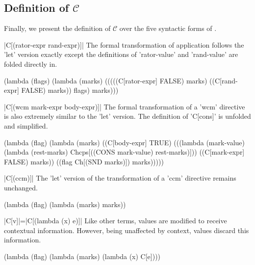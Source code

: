 \subsection{Definition of $\mathcal{C}$}

Finally, we present the definition of $\mathcal{C}$ over the five syntactic forms of \cm.

\begin{schemedefinition}{\scheme|C[(rator-expr rand-expr)]|}
The formal transformation of application follows the \scheme'let' version exactly except the definitions of \scheme'rator-value' and \scheme'rand-value' are folded directly in.
\begin{schemeblock}
\begin{schemedisplay}
(lambda (flags)
  (lambda (marks)
    (((((C[rator-expr] FALSE) marks)
       ((C[rand-expr] FALSE) marks))
      flags)
     marks)))
\end{schemedisplay}
\end{schemeblock}
\end{schemedefinition}

\begin{schemedefinition}{\scheme|C[(wcm mark-expr body-expr)]|}
The formal transformation of a \scheme'wcm' directive is also extremely similar to the \scheme'let' version. The definition of \scheme'C[cons]' is unfolded and simplified.
\begin{schemeblock}
\begin{schemedisplay}
(lambda (flag)
  (lambda (marks)
    ((C[body-expr] TRUE)
     (((lambda (mark-value) (lambda (rest-marks) Chcps[((CONS mark-value) rest-marks)]))
       ((C[mark-expr] FALSE) marks))
      ((flag Ch[(SND marks)]) marks)))))
\end{schemedisplay}
\end{schemeblock}
\end{schemedefinition}

\begin{schemedefinition}{\scheme|C[(ccm)]|}
The \scheme'let' version of the transformation of a \scheme'ccm' directive remains unchanged.
\begin{schemeblock}
\begin{schemedisplay}
(lambda (flag)
  (lambda (marks)
    marks))
\end{schemedisplay}
\end{schemeblock}
\end{schemedefinition}

\begin{schemedefinition}{\scheme|C[v]|=\scheme|C[(lambda (x) e)]|}
Like other terms, values are modified to receive contextual information. However, being unaffected by context, values discard this information.
\begin{schemeblock}
\begin{schemedisplay}
(lambda (flag)
  (lambda (marks)
    (lambda (x) C[e])))
\end{schemedisplay}
\end{schemeblock}
\end{schemedefinition}

